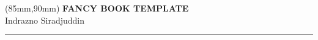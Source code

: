 \documentclass[12pt]{extreport}
\begin{document}



\thispagestyle{empty}
\begin{textblock*}{60mm}(85mm,90mm)
	\noindent
	{\sffamily\LARGE\bfseries FANCY BOOK TEMPLATE}\\
	\noindent
	{\sffamily\small Indrazno Siradjuddin}\\
	{\color{dark-gray}\rule[5pt]{170pt}{3pt}}
\end{textblock*}
\null\newpage

% 


\thispagestyle{empty}
\null\newpage

\renewcommand\contentsname{Table of Contents} %
\tableofcontents



\thispagestyle{empty}
\null\newpage

\setcounter{page}{1}




% 
% 
% 
% 
% 
% 
% 
% 
% 
% 
% 
%     
%     
\ifodd\value{page}
\thispagestyle{empty}
\null\newpage
\fi
\end{document}
